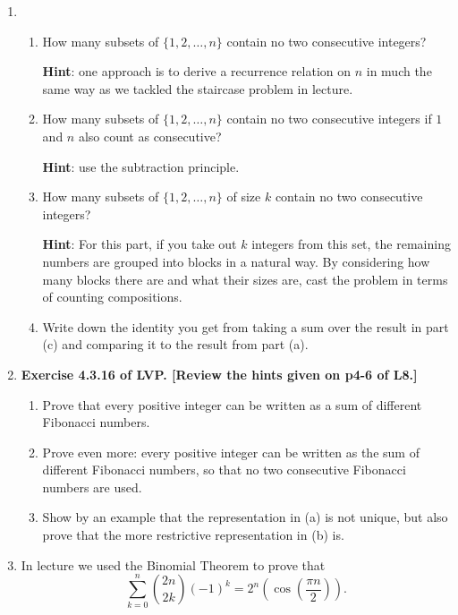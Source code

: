 \documentclass[11pt]{article}
\begin{document}
\begin{enumerate}

\item 
\begin{enumerate}
\item How many subsets of $\{1,2,\ldots, n\}$ contain no two consecutive integers? 

{\bf Hint}: one approach is to derive a recurrence relation on $n$ in much the same way as we tackled the staircase problem in lecture.

\item How many subsets of $\{1,2,\ldots, n\}$ contain no two consecutive integers if $1$ and $n$ also count as consecutive? 

{\bf Hint}: use the subtraction principle.

\item How many subsets of $\{1,2,\ldots, n\}$ of size $k$ contain no two consecutive integers?

{\bf Hint}: For this part, if you take out $k$ integers from this set, the remaining numbers are grouped into blocks in a natural way.  By considering how many blocks there are and what their sizes are, cast the problem in terms of counting compositions. 

\item Write down the identity you get from taking a sum over the result in part (c) and comparing it to the result from part (a).

\end{enumerate}

\item {\bf Exercise 4.3.16 of LVP. [Review the hints given on p4-6 of L8.] } 
\begin{enumerate}
\item Prove that every positive integer can be written as a sum of different Fibonacci numbers.

\item Prove even more: every positive integer can be written as the sum of different Fibonacci numbers, so that no two consecutive Fibonacci numbers are used.

\item Show by an example that the representation in (a) is not unique, but also prove that the more restrictive representation in (b) is.
\end{enumerate}

\item In lecture we used the Binomial Theorem to prove that 
\[
\sum_{k=0}^n \binom{2n}{2k} (-1)^k = 2^n \left(\cos\left(\frac{\pi n}{2}\right)\right).
\]


\end{enumerate}
\end{document}
